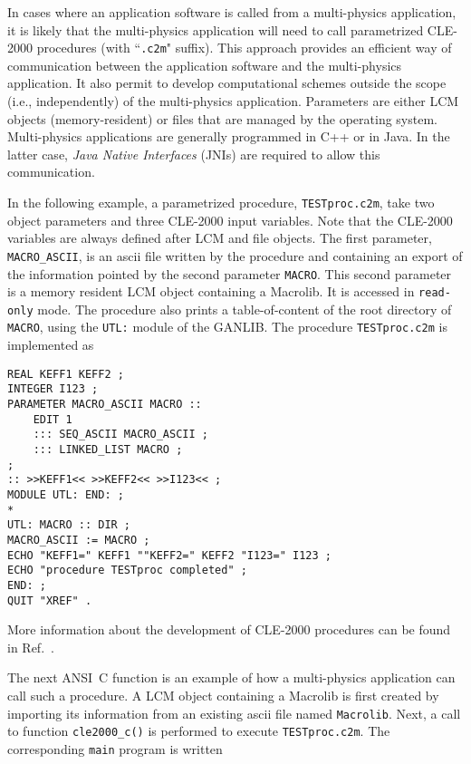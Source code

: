 In cases where an application software is called from a multi-physics application, it is likely that the multi-physics application
will need to call parametrized CLE-2000 procedures (with ``{\tt .c2m}" suffix). This approach provides an efficient way of communication between
the application software and the multi-physics application. It also permit to develop computational schemes outside the scope (i.e., independently)
of the multi-physics application. Parameters are either LCM objects (memory-resident) or
files that are managed by the operating system. Multi-physics applications are generally programmed
in C++ or in Java. In the latter case, {\sl Java Native Interfaces} (JNIs) are required to allow this communication.

\vskip 0.08cm

In the following example, a parametrized procedure, {\tt TESTproc.c2m}, take two object parameters and three CLE-2000 input variables.
Note that the CLE-2000 variables are always defined after LCM and file objects. The first parameter, {\tt MACRO\_ASCII}, is
an {\sc ascii} file written by the procedure and containing an export of the information pointed by the second parameter {\tt MACRO}. This second parameter is a
memory resident LCM object containing a Macrolib. It is accessed in {\tt read-only} mode. The procedure also prints a table-of-content
of the root directory of {\tt MACRO}, using the {\tt UTL:} module of the GANLIB. The procedure {\tt TESTproc.c2m} is implemented as
\begin{verbatim}
REAL KEFF1 KEFF2 ;
INTEGER I123 ;
PARAMETER MACRO_ASCII MACRO ::
    EDIT 1
    ::: SEQ_ASCII MACRO_ASCII ;
    ::: LINKED_LIST MACRO ;
;
:: >>KEFF1<< >>KEFF2<< >>I123<< ;
MODULE UTL: END: ;
*
UTL: MACRO :: DIR ;
MACRO_ASCII := MACRO ;
ECHO "KEFF1=" KEFF1 ""KEFF2=" KEFF2 "I123=" I123 ;
ECHO "procedure TESTproc completed" ;
END: ;
QUIT "XREF" .
\end{verbatim}

\noindent More information about the development of CLE-2000 procedures can be found in Ref.~.

\vskip 0.08cm

The next ANSI~C function is an example of how a multi-physics application can call such a procedure. A LCM object
containing a Macrolib is first created by importing its information from an existing {\sc ascii} file named {\tt Macrolib}. Next, a call to function
{\tt cle2000\_c()} is performed to execute {\tt TESTproc.c2m}. The corresponding {\tt main} program is written
\goodbreak

